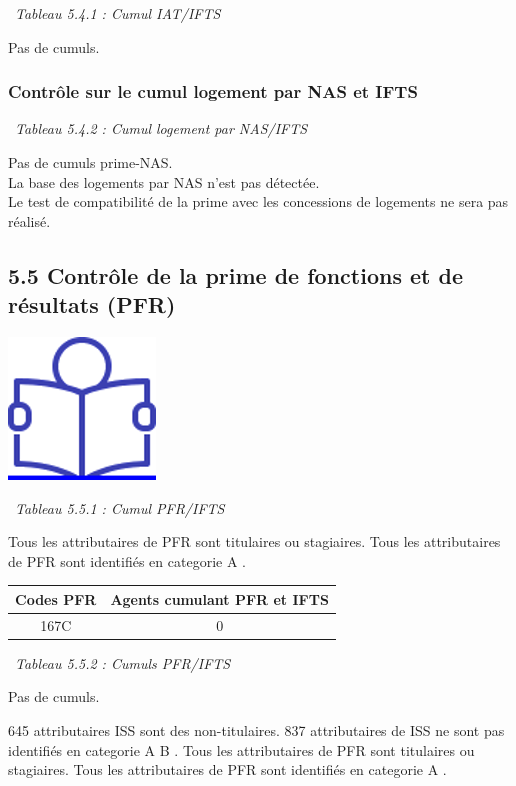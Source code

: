 ~\emph{Tableau 5.4.1 : Cumul IAT/IFTS}

Pas de cumuls.

\hypertarget{controle-sur-le-cumul-logement-par-nas-et-ifts}{%
\subsubsection{Contrôle sur le cumul logement par NAS et
IFTS}\label{controle-sur-le-cumul-logement-par-nas-et-ifts}}

~\emph{Tableau 5.4.2 : Cumul logement par NAS/IFTS}

Pas de cumuls prime-NAS.\\
La base des logements par NAS n'est pas détectée.\\
Le test de compatibilité de la prime avec les concessions de logements
ne sera pas réalisé.

\hypertarget{controle-de-la-prime-de-fonctions-et-de-resultats-pfr}{%
\subsection{5.5 Contrôle de la prime de fonctions et de résultats
(PFR)}\label{controle-de-la-prime-de-fonctions-et-de-resultats-pfr}}

\href{../Docs/Notices/fiche_PFR.odt}{\includegraphics{icones/Notice.png}}

~\emph{Tableau 5.5.1 : Cumul PFR/IFTS}

Tous les attributaires de PFR sont titulaires ou stagiaires. Tous les
attributaires de PFR sont identifiés en categorie A .

\begin{longtable}[]{@{}cc@{}}
\toprule
Codes PFR & Agents cumulant PFR et IFTS\tabularnewline
\midrule
\endhead
167C & 0\tabularnewline
\bottomrule
\end{longtable}

~\emph{Tableau 5.5.2 : Cumuls PFR/IFTS}

Pas de cumuls.

645 attributaires ISS sont des non-titulaires. 837 attributaires de ISS
ne sont pas identifiés en categorie A B . Tous les attributaires de PFR
sont titulaires ou stagiaires. Tous les attributaires de PFR sont
identifiés en categorie A .

